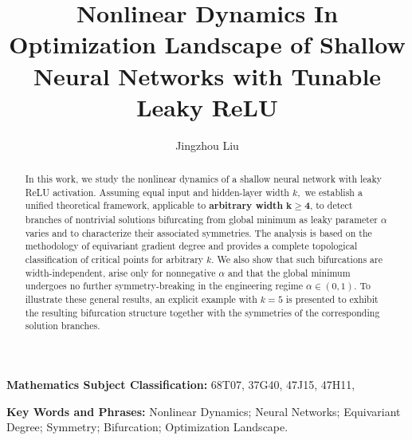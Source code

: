 \documentclass{amsart}%
\def\noi{\noindent}
\def\noi{\noindent}
\begin{document}
\title[Nonlinear Dynamics of Leaky ReLU Network]{Nonlinear Dynamics In Optimization Landscape of Shallow Neural Networks with Tunable Leaky ReLU}
\author[J. Liu]{Jingzhou Liu}
\address{Department of Mathematical Science The University of Texas at Dallas, 75080 USA}

\begin{abstract}
In this work, we study the nonlinear dynamics of a shallow neural network with leaky ReLU activation. Assuming equal input and hidden-layer width $k,$ we establish a unified theoretical framework, applicable to \textbf{arbitrary width} $\mathbf{k\ge 4}$, to detect branches of nontrivial solutions bifurcating from global minimum as leaky parameter $\alpha$ varies and to characterize their associated symmetries. The analysis is based on the methodology of equivariant gradient degree and provides a complete
topological classification of critical points for arbitrary $k$. We also show that such bifurcations are width-independent, arise only for nonnegative $\alpha$ and that the global minimum undergoes no further symmetry-breaking in the engineering regime $\alpha\in (0, 1).$ To illustrate these general results, an explicit example with $k=5$ is presented to exhibit the resulting bifurcation structure together with the symmetries of the corresponding solution branches.
\end{abstract}
\maketitle
\noi \textbf{Mathematics Subject Classification:} 68T07, 37G40, 47J15, 47H11,  

\medskip

\noi \textbf{Key Words and Phrases:} Nonlinear Dynamics; Neural Networks; Equivariant Degree; Symmetry; Bifurcation; Optimization Landscape.
\end{document}
